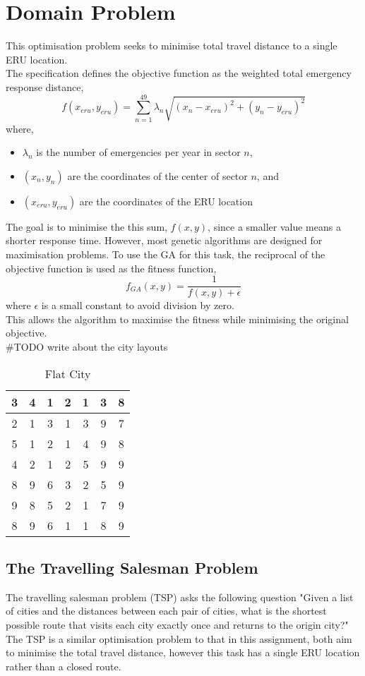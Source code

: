 \documentclass[12pt,a4paper]{article}
\begin{document}
\section{Domain Problem}
This optimisation problem seeks to minimise total travel distance to a single ERU location.\\
The specification defines the objective function as the weighted total emergency response distance,
$$f(x_{eru},y_{eru})=\sum_{n=1}^{49}\lambda_n\sqrt{(x_n-x_{eru})^2+(y_n-y_{eru})^2}$$
where,
\begin{itemize}
	\item $\lambda_n$ is the number of emergencies per year in sector $n$,
	\item $(x_n,y_n)$ are the coordinates of the center of sector $n$, and
	\item $(x_{eru},y_{eru})$ are the coordinates of the ERU location
\end{itemize}
The goal is to minimise the this sum, $f(x,y)$, since a smaller value means a shorter response time. However, most genetic algorithms are designed for maximisation problems. To use the GA for this task, the reciprocal of the objective function is used as the fitness function,
$$f_{GA}(x,y)=\dfrac{1}{f(x,y)+\epsilon}$$
where $\epsilon$ is a small constant to avoid division by zero.\\
This allows the algorithm to maximise the fitness while minimising the original objective.\\
\#TODO write about the city layouts
\begin{table}[H]
	\centering
	\caption{Flat City}
	\label{tab:Flay City}
	\begin{tabular}{|c|c|c|c|c|c|c|}
	\hline
	3 & 4 & 1 & 2 & 1 & 3 & 8 \\ \hline
2 & 1 & 3 & 1 & 3 & 9 & 7 \\ \hline
5 & 1 & 2 & 1 & 4 & 9 & 8 \\ \hline
4 & 2 & 1 & 2 & 5 & 9 & 9 \\ \hline
8 & 9 & 6 & 3 & 2 & 5 & 9 \\ \hline
9 & 8 & 5 & 2 & 1 & 7 & 9 \\ \hline
8 & 9 & 6 & 1 & 1 & 8 & 9 \\ \hline
\end{tabular}
\end{table}
\subsection{The Travelling Salesman Problem}
The travelling salesman problem (TSP) asks the following question "Given a list of cities and the distances between each pair of cities, what is the shortest possible route that visits each city exactly once and returns to the origin city?" The TSP is a similar optimisation problem to that in this assignment, both aim to minimise the total travel distance, however this task has a single ERU location rather than a closed route. 
\end{document}

